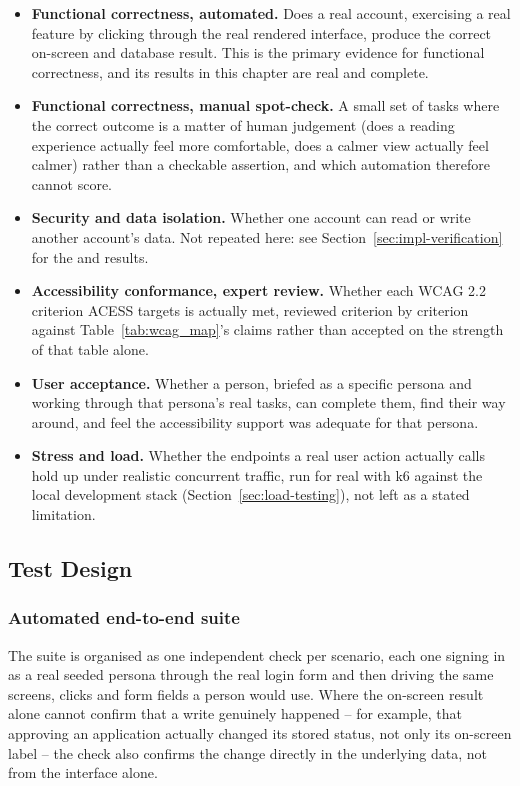 \documentclass[12pt, oneside]{article} %
\newcommand{\tcode}[1]{\path{#1}}
\begin{document}
\begin{itemize}
    \item \textbf{Functional correctness, automated.} Does a real account, exercising a real feature by clicking through the real rendered interface, produce the correct on-screen and database result. This is the primary evidence for functional correctness, and its results in this chapter are real and complete.
    \item \textbf{Functional correctness, manual spot-check.} A small set of tasks where the correct outcome is a matter of human judgement (does a reading experience actually feel more comfortable, does a calmer view actually feel calmer) rather than a checkable assertion, and which automation therefore cannot score.
    \item \textbf{Security and data isolation.} Whether one account can read or write another account's data. Not repeated here: see Section~\ref{sec:impl-verification} for the \tcode{verify:rls} and \tcode{verify:scenarios} results.
    \item \textbf{Accessibility conformance, expert review.} Whether each WCAG 2.2 criterion ACESS targets is actually met, reviewed criterion by criterion against Table~\ref{tab:wcag_map}'s claims rather than accepted on the strength of that table alone.
    \item \textbf{User acceptance.} Whether a person, briefed as a specific persona and working through that persona's real tasks, can complete them, find their way around, and feel the accessibility support was adequate for that persona.
    \item \textbf{Stress and load.} Whether the endpoints a real user action actually calls hold up under realistic concurrent traffic, run for real with k6 against the local development stack (Section~\ref{sec:load-testing}), not left as a stated limitation.
\end{itemize}

\subsection{Test Design}

\subsubsection{Automated end-to-end suite}
\label{sec:automated-suite}

The suite is organised as one independent check per scenario, each one signing in as a real seeded persona through the real login form and then driving the same screens, clicks and form fields a person would use. Where the on-screen result alone cannot confirm that a write genuinely happened -- for example, that approving an application actually changed its stored status, not only its on-screen label -- the check also confirms the change directly in the underlying data, not from the interface alone.
\end{document}
